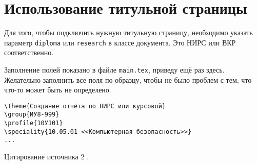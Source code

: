 \section{Использование титульной страницы}

Для того, чтобы подключить нужную титульную страницу, необходимо 
указать параметр \texttt{diploma} или \texttt{research} в классе документа. 
Это НИРС или ВКР соответственно. 

Заполнение полей показано в файле \texttt{main.tex}, приведу ещё раз здесь. 
Желательно заполнить все поля по образцу, чтобы не было проблем с тем, 
что что-то может быть не определено.

\begin{verbatim}
\theme{Создание отчёта по НИРС или курсовой}
\group{ИУ8-999}
\profile{10У101}
\speciality{10.05.01 <<Компьютерная безопасность>>}
...
\end{verbatim}

\lipsum[1-5]

Цитирование источника 2 \cite{Wikipedia2}.

